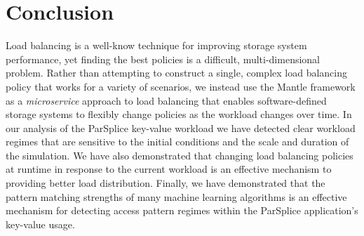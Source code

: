 \section{Conclusion}

Load balancing is a well-know technique for improving storage system
performance, yet finding the best policies is a difficult, multi-dimensional
problem. Rather than attempting to construct a single, complex load balancing
policy that works for a variety of scenarios, we instead use the Mantle
framework as a \emph{microservice} approach to load balancing that enables
software-defined storage systems to flexibly change policies as the workload
changes over time.  In our analysis of the ParSplice key-value workload we have
detected clear workload regimes that are sensitive to the initial conditions
and the scale and duration of the simulation. We have also demonstrated that
changing load balancing policies at runtime in response to the current workload
is an effective mechanism to providing better load distribution.  Finally, we
have demonstrated that the pattern matching strengths of many machine learning
algorithms is an effective mechanism for detecting access pattern regimes
within the ParSplice application's key-value usage.

